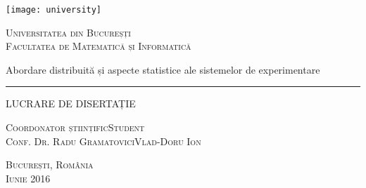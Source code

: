 \begin{titlepage}
	\begin{center}

		\texttt{[image: university]}

		\vspace{0.5cm}
		\LARGE \textsc{Universitatea din Bucureșți}
		\\
		\vspace{0.5cm}
		\Large \textsc{Facultatea de Matematică și Informatică}

		\vfill

		\Huge Abordare distribuită și aspecte statistice ale sistemelor de experimentare
		\rule{\textwidth}{1pt}
		\Large LUCRARE DE DISERTAȚIE

		\vfill

		\Large
		\textsc{Coordonator științific}\hfill \textsc{Student}
		\\
		\large
		\textsc{Conf. Dr. Radu Gramatovici}\hfill \textsc{Vlad-Doru Ion}
	
		\vspace{1.5cm}
		\textsc{București, România}\\
		\textsc{Iunie 2016}

	\end{center}
\end{titlepage}
 
